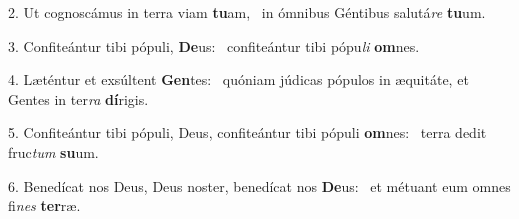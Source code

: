 2. Ut cognoscámus in terra viam \textbf{tu}am, \ast\  in ómnibus Géntibus salutá\textit{re} \textbf{tu}um.\

3. Confiteántur tibi pópuli, \textbf{De}us: \ast\  confiteántur tibi pópu\textit{li} \textbf{om}nes.\

4. Læténtur et exsúltent \textbf{Gen}tes: \ast\  quóniam júdicas pópulos in æquitáte, et Gentes in ter\textit{ra} \textbf{dí}rigis.\

5. Confiteántur tibi pópuli, Deus, confiteántur tibi pópuli \textbf{om}nes: \ast\  terra dedit fruc\textit{tum} \textbf{su}um.\

6. Benedícat nos Deus, Deus noster, benedícat nos \textbf{De}us: \ast\  et métuant eum omnes fi\textit{nes} \textbf{ter}ræ.\

